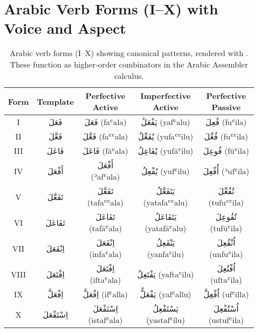 \documentclass[12pt]{article}
\theoremstyle{remark}
\begin{document}
\section{Arabic Verb Forms (I–X) with Voice and Aspect}
\label{app:forms}
\renewcommand{\arraystretch}{1.3}
\begin{table}[h!]
\centering
\begin{tabular}{|c|c|c|c|c|}
\hline
Form & Template & Perfective Active & Imperfective Active & Perfective Passive \\
\hline
I   & \textarabic{فَعَلَ} & \textarabic{فَعَلَ} (faʿala) & \textarabic{يَفْعَلُ} (yafʿalu) & \textarabic{فُعِلَ} (fuʿila) \\
II  & \textarabic{فَعَّلَ} & \textarabic{فَعَّلَ} (faʿʿala) & \textarabic{يُفَعِّلُ} (yufaʿʿilu) & \textarabic{فُعِّلَ} (fuʿʿila) \\
III & \textarabic{فَاعَلَ} & \textarabic{فَاعَلَ} (fāʿala) & \textarabic{يُفَاعِلُ} (yufāʿilu) & \textarabic{فُوعِلَ} (fūʿila) \\
IV  & \textarabic{أَفْعَلَ} & \textarabic{أَفْعَلَ} (ʾafʿala) & \textarabic{يُفْعِلُ} (yufʿilu) & \textarabic{أُفْعِلَ} (ʾufʿila) \\
V   & \textarabic{تَفَعَّلَ} & \textarabic{تَفَعَّلَ} (tafaʿʿala) & \textarabic{يَتَفَعَّلُ} (yatafaʿʿalu) & \textarabic{تُفُعِّلَ} (tufuʿʿila) \\
VI  & \textarabic{تَفَاعَلَ} & \textarabic{تَفَاعَلَ} (tafāʿala) & \textarabic{يَتَفَاعَلُ} (yatafāʿalu) & \textarabic{تُفُوعِلَ} (tufūʿila) \\
VII & \textarabic{اِنْفَعَلَ} & \textarabic{اِنْفَعَلَ} (infaʿala) & \textarabic{يَنْفَعِلُ} (yanfaʿilu) & \textarabic{اُنْفُعِلَ} (unfuʿila) \\
VIII& \textarabic{اِفْتَعَلَ} & \textarabic{اِفْتَعَلَ} (iftaʿala) & \textarabic{يَفْتَعِلُ} (yaftaʿilu) & \textarabic{اُفْتُعِلَ} (uftaʿila) \\
IX  & \textarabic{اِفْعَلَّ} & \textarabic{اِفْعَلَّ} (ifʿalla) & \textarabic{يَفْعَلُّ} (yafʿallu) & \textarabic{اُفْعِلَّ} (ufʿilla) \\
X   & \textarabic{اِسْتَفْعَلَ} & \textarabic{اِسْتَفْعَلَ} (istafʿala) & \textarabic{يَسْتَفْعِلُ} (yastafʿilu) & \textarabic{اُسْتُفْعِلَ} (ustufʿila) \\
\hline
\end{tabular}
\caption{Arabic verb forms (I–X) showing canonical patterns, rendered with \textarabic{}. These function as higher-order combinators in the Arabic Assembler calculus.}
\end{table}
\end{document}
